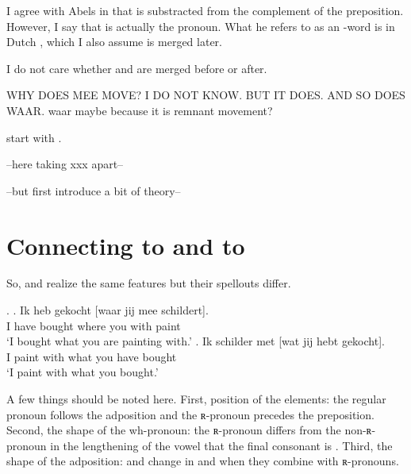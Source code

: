 \documentclass{article}
\begin{document}
I agree with Abels in that  is substracted from the complement of the preposition. However, I say that  is actually the pronoun. What he refers to as an -word is in Dutch , which I also assume is merged later.




I do not care whether  and  are merged before or after.

WHY DOES MEE MOVE? I DO NOT KNOW.
BUT IT DOES.
AND SO DOES WAAR.
waar maybe because it is remnant movement?




start with .


--here taking xxx apart--

--but first introduce a bit of theory--
















\section{Connecting  to  and  to }

So,  and  realize the same features but their spellouts differ.

\ex.
\ag. Ik heb gekocht [waar jij mee schildert].\\
 I have bought where you with paint\\
 `I bought what you are painting with.'
\bg. Ik schilder met [wat jij hebt gekocht].\\
 I paint with what you have bought\\
 `I paint with what you bought.'

A few things should be noted here. First, position of the elements: the regular pronoun follows the adposition and the ʀ-pronoun precedes the preposition. Second, the shape of the wh-pronoun: the ʀ-pronoun differs from the non-ʀ-pronoun in the lengthening of the vowel that the final consonant is . Third, the shape of the adposition:  and  change in  and  when they combine with ʀ-pronouns.
\end{document}
